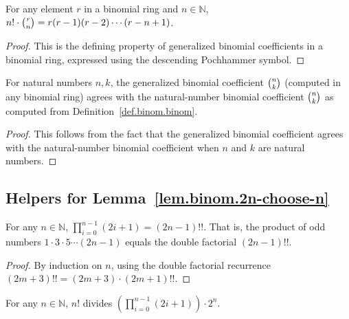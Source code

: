 \begin{lemma}
\label{lem.binom.factorial_smul}
\leanhelper
\leanok
For any element $r$ in a binomial ring and $n \in \mathbb{N}$,
$n! \cdot \dbinom{r}{n} = r(r-1)(r-2)\cdots(r-n+1)$.
\end{lemma}

\begin{proof}
\leanok
This is the defining property of generalized binomial coefficients in a binomial ring,
expressed using the descending Pochhammer symbol.
\end{proof}

\begin{lemma}
\label{lem.binom.natCast}
\leanhelper
\leanok
For natural numbers $n, k$, the generalized binomial coefficient $\dbinom{n}{k}$
(computed in any binomial ring) agrees with the natural-number binomial coefficient
$\dbinom{n}{k}$ as computed from Definition~\ref{def.binom.binom}.
\end{lemma}

\begin{proof}
\leanok
This follows from the fact that the generalized binomial coefficient
agrees with the natural-number binomial coefficient when $n$ and $k$ are natural numbers.
\end{proof}

\subsection{Helpers for Lemma~\ref{lem.binom.2n-choose-n}}

\begin{lemma}
\label{lem.binom.prod_odd_eq_doubleFactorial}
\leanhelper
\leanok
For any $n\in\mathbb{N}$, $\prod_{i=0}^{n-1}(2i+1) = (2n-1)!!$.
That is, the product of odd numbers $1\cdot 3\cdot 5\cdots(2n-1)$ equals the double factorial $(2n-1)!!$.
\end{lemma}

\begin{proof}
\leanok
By induction on $n$, using the double factorial recurrence $(2m+3)!! = (2m+3)\cdot(2m+1)!!$.
\end{proof}

\begin{lemma}
\label{lem.binom.factorial_dvd_prod_odd_mul_pow}
\leanhelper
\leanok
For any $n\in\mathbb{N}$, $n!$ divides $\left(\prod_{i=0}^{n-1}(2i+1)\right)\cdot 2^n$.
\end{lemma}

